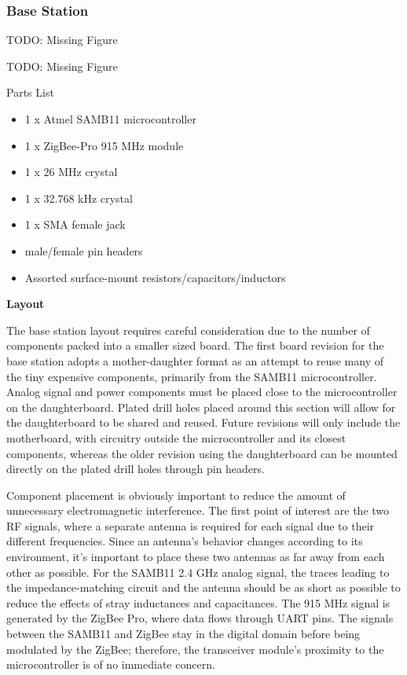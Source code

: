 \documentclass[journal,compsoc]{IEEEtran}
\begin{document}
\subsubsection{Base Station}

TODO: Missing Figure

TODO: Missing Figure

Parts List
\begin{itemize}
  \item 1 x Atmel SAMB11 microcontroller
  \item 1 x ZigBee-Pro 915 MHz module
  \item 1 x 26 MHz crystal
  \item 1 x 32.768 kHz crystal
  \item 1 x SMA female jack
  \item male/female pin headers
  \item Assorted surface-mount resistors/capacitors/inductors
\end{itemize}

\textbf {Layout}

The base station layout requires careful consideration due to the number of components packed into a smaller sized board.  The first board revision for the base station adopts a mother-daughter format as an attempt to reuse many of the tiny expensive components, primarily from the SAMB11 microcontroller.  Analog signal and power components must be placed close to the microcontroller on the daughterboard.  Plated drill holes placed around this section will allow for the daughterboard to be shared and reused.  Future revisions will only include the motherboard, with circuitry outside the microcontroller and its closest components, whereas the older revision using the daughterboard can be mounted directly on the plated drill holes through pin headers.

Component placement is obviously important to reduce the amount of unnecessary electromagnetic interference.  The first point of interest are the two RF signals, where a separate antenna is required for each signal due to their different frequencies.  Since an antenna’s behavior changes according to its environment, it’s important to place these two antennas as far away from each other as possible.  For the SAMB11 2.4 GHz analog signal, the traces leading to the impedance-matching circuit and the antenna should be as short as possible to reduce the effects of stray inductances and capacitances.  The 915 MHz signal is generated by the ZigBee Pro, where data flows through UART pins.  The signals between the SAMB11 and ZigBee stay in the digital domain before being modulated by the ZigBee;  therefore, the transceiver module’s proximity to the microcontroller is of no immediate concern.
\end{document}
